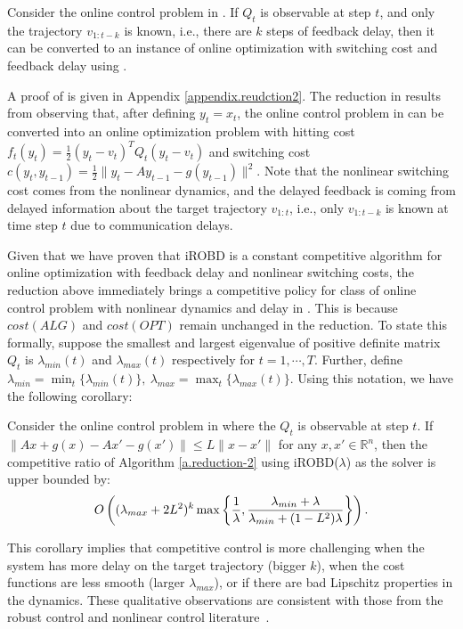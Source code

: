 
\begin{theorem} \label{t.reduction2}
Consider the online control problem in . If $Q_t$ is observable at step $t$, and only the trajectory $v_{1:t-k}$ is known, i.e., there are $k$ steps of feedback delay, then it can be converted to an instance of online optimization with switching cost and feedback delay using .
\end{theorem}


A proof of  is given in Appendix \ref{appendix.reudction2}. The reduction in  results from observing that, after defining $y_t=x_t$, the online control problem in  can be converted into an online optimization problem with hitting cost $f_t(y_t)=\frac{1}{2}(y_t-v_t)^TQ_t(y_t-v_t)$ and switching cost $c(y_t,y_{t-1})=\frac{1}{2}\|y_t-Ay_{t-1}-g(y_{t-1})\|^2$. Note that the nonlinear switching cost comes from the nonlinear dynamics, and the delayed feedback is coming from delayed information about the target trajectory $v_{1:t}$, i.e., only $v_{1:t-k}$ is known at time step $t$ due to communication delays.


Given that we have proven that iROBD is a constant competitive algorithm for online optimization with feedback delay and nonlinear switching costs, the reduction above immediately brings a competitive policy for class of online control problem with nonlinear dynamics and delay in . This is because $cost(ALG)$ and $cost(OPT)$ remain unchanged in the reduction. To state this formally, suppose the smallest and largest eigenvalue of positive definite matrix $Q_t$ is $\lambda_{min}(t)$ and $\lambda_{max}(t)$ respectively for $t=1,\cdots,T$. Further, define $\lambda_{min}=\min_{t}\{\lambda_{min}(t)\},~\lambda_{max}=\max_{t}\{\lambda_{max}(t)\}.$
Using this notation, we have the following corollary:

\begin{corollary}
    Consider the online control problem in  where the $Q_t$ is observable at step $t$. If $\|Ax+g(x)-Ax'-g(x')\|\le L\|x-x'\|$ for any $x,x'\in\mathbb{R}^n$, then the competitive ratio of Algorithm \ref{a.reduction-2} using iROBD($\lambda$) as the solver is upper bounded by:
    \begin{align}
        O\left((\lambda_{max}+2L^2)^k\max\left\{\frac{1}{\lambda},\frac{\lambda_{min}+\lambda}{\lambda_{min}+(1-L^2)\lambda}\right\}\right).\notag
    \end{align}
\end{corollary}

This corollary implies that competitive control is more challenging when the system has more delay on the target trajectory (bigger $k$), when the cost functions are less smooth (larger $\lambda_{max}$), or if there are bad Lipschitz properties in the dynamics.  These qualitative observations are consistent with those from the robust control and nonlinear control literature~\citep{slotine1991applied,zhou1996robust}.